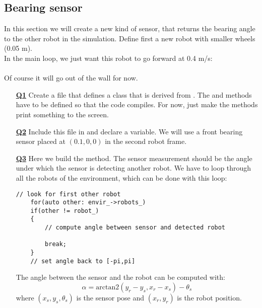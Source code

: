 \documentclass{ecnreport}
\begin{document}
\newpage

\subsection{Bearing sensor}

In this section we will create a new kind of sensor, that returns the bearing angle to the other robot in the simulation.
Define first a new robot with smaller wheels (0.05 m). \\
In the main loop, we just want this robot to go forward at 0.4 m/s: \\\\
Of course it will go out of the wall for now.

\begin{itemize}
\medskip\item[\textbf{\underline{Q1}}] Create a  file that defines a  class that is derived from . The  and  methods have to be defined so that the code compiles. For now, just make the methods print something to the screen.

\medskip\item[\textbf{\underline{Q2}}] Include this file in  and declare a  variable.  We will use a front bearing sensor placed at $(0.1, 0,0)$ in the second robot frame.

\medskip\item[\textbf{\underline{Q3}}] Here we build the  method. The sensor measurement should be the angle under which the sensor is detecting another robot.
We have to loop through all the robots of the environment, which can be done with this loop:
\begin{center}\cppstyle
\begin{lstlisting}
// look for first other robot
    for(auto other: envir_->robots_)
	if(other != robot_)
	{
	    // compute angle between sensor and detected robot
	    
	    break;
	}
    // set angle back to [-pi,pi]
\end{lstlisting}
\end{center}
The angle between the sensor and the robot can be computed with:
\begin{equation*}
 \alpha = \text{arctan2}(y_r - y_s, x_r-x_s) - \theta_s
\end{equation*}where $(x_s,y_s,\theta_s)$ is the sensor pose and $(x_r,y_r)$ is the robot position.


\end{itemize}
\end{document}
